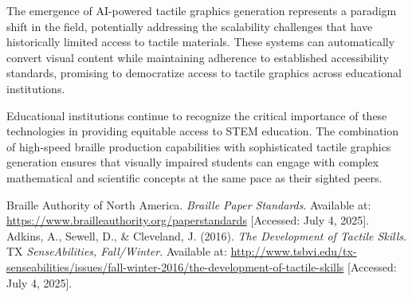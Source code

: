 The emergence of AI-powered tactile graphics generation represents a paradigm shift in the field, potentially addressing the scalability challenges that have historically limited access to tactile materials. These systems can automatically convert visual content while maintaining adherence to established accessibility standards, promising to democratize access to tactile graphics across educational institutions.

Educational institutions continue to recognize the critical importance of these technologies in providing equitable access to STEM education. The combination of high-speed braille production capabilities with sophisticated tactile graphics generation ensures that visually impaired students can engage with complex mathematical and scientific concepts at the same pace as their sighted peers.

\begin{thebibliography}{99}
 Braille Authority of North America. \textit{Braille Paper Standards}. Available at: \url{https://www.brailleauthority.org/paperstandards} [Accessed: July 4, 2025].
 Adkins, A., Sewell, D., \& Cleveland, J. (2016). \textit{The Development of Tactile Skills}. TX \emph{SenseAbilities, Fall/Winter}. Available at: \url{http://www.tsbvi.edu/tx-senseabilities/issues/fall-winter-2016/the-development-of-tactile-skills} [Accessed: July 4, 2025].
\end{thebibliography}

